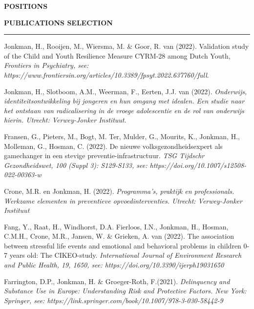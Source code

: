 \documentclass[
  16,
]{article}
\begin{document}
\begin{large}{\bf POSITIONS}
\vspace{7pt}

\begin{large}
  {\bf PUBLICATIONS SELECTION}
  \vspace{3pt}
  \hrule
\end{large}

Jonkman, H., Rooijen, M., Wiersma, M. \& Goor, R. van (2022). Validation
study of the Child and Youth Resilience Measure CYRM-28 among Dutch
Youth,
\emph{Frontiers in Psychiatry, see: https://www.frontiersin.org/articles/10.3389/fpsyt.2022.637760/full}.

\vspace{3pt}

Jonkman, H., Slotboom, A.M., Weerman, F., Eerten, J.J. van (2022).
\emph{Onderwijs, identiteitsontwikkeling bij jongeren en hun omgang met idealen. Een studie naar het ontstaan van radicalisering in de vroege adolescentie en de rol van onderwijs hierin. Utrecht: Verwey-Jonker Instituut}.

\vspace{3pt}

Fransen, G., Pieters, M., Bogt, M. Ter, Mulder, G., Mourits, K.,
Jonkman, H., Molleman, G., Hosman, C. (2022). De nieuwe
volksgezondheidsexpert als gamechanger in een stevige
preventie-infrastructuur.
\emph{TSG Tijdschr Gezondheidswet, 100 (Suppl 3): S129-S133, see: https://doi.org/10.1007/s12508-022-00363-w}

\vspace{3pt}

Crone, M.R. en Jonkman, H. (2022).
\emph{Programma’s, praktijk en professionals. Werkzame elementen in preventieve opvoedinterventies. Utrecht: Verwey-Jonker Instituut}

\vspace{3pt}

Fang, Y., Raat, H., Windhorst, D.A. Fierloos, I.N., Jonkman, H., Hosman,
C.M.H., Crone, M.R., Jansen, W. \& Grieken, A. van (2022). The
association between stressful life events and emotional and behavioral
problems in children 0-7 years old: The CIKEO-study.
\emph{International Journal of Environment Research and Public Health, 
19, 1650, see: https://doi.org/10.3390/ijerph19031650}

\vspace{3pt}

Farrington, D.P., Jonkman, H. \& Groeger-Roth, F.(2021).
\emph{Delinquency and Substance Use in Europe: Understanding Risk and Protective Factors. New York: Springer, see: https://link.springer.com/book/10.1007/978-3-030-58442-9}


\end{large}
\end{document}
